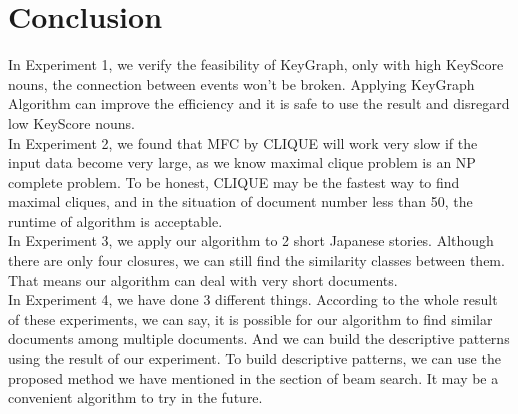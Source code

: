 \newpage
\section{Conclusion}
In Experiment 1, we verify the feasibility of KeyGraph, only with high KeyScore nouns, the connection between events won't be broken. Applying KeyGraph Algorithm can improve the efficiency and it is safe to use the result and disregard low KeyScore nouns.\\
In Experiment 2, we found that MFC by CLIQUE will work very slow if the input data become very large, as we know maximal clique problem is an NP complete problem. To be honest, CLIQUE may be the fastest way to find maximal cliques, and in the situation of document number less than 50, the runtime of algorithm is acceptable.\\
In Experiment 3, we apply our algorithm to 2 short Japanese stories. Although there are only four closures, we can still find the similarity classes between them. That means our algorithm can deal with very short documents.\\
In Experiment 4, we have done 3 different things. According to the whole result of these experiments, we can say, it is possible for our algorithm to find similar documents among multiple documents. And we can build the descriptive patterns using the result of our experiment. To build descriptive patterns, we can use the proposed method we have mentioned in the section of beam search. It may be a convenient algorithm to try in the future.